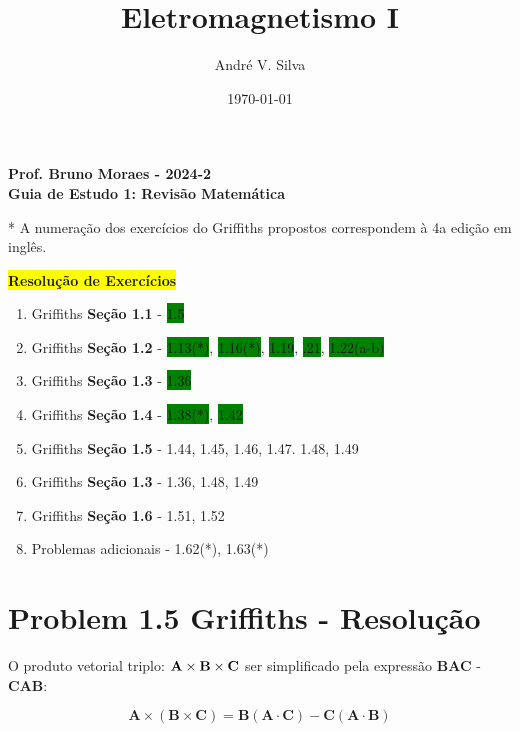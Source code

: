 \documentclass[a4paper,12pt]{article}
\title{ \textbf{\large Eletromagnetismo I }}
\author{Andr\'e V. Silva}
\date{\today}
\begin{document}
\maketitle

\begin{center}
    \textbf{Prof. Bruno Moraes - 2024-2}\\
    \textbf{Guia de Estudo 1: Revisão Matemática}
    \end{center}
    
    * A numeração dos exercícios do Griffiths propostos correspondem à 4a edição em inglês.\\
    
    \begin{center}
    \colorbox{yellow}{\textbf{Resolu\c{c}\~ao de Exerc\'icios}}
    \end{center}
    
    \begin{enumerate}
    \item Griffiths \textbf{Seção 1.1} - \colorbox{green}{1.5} 
    \item Griffiths \textbf{Seção 1.2} - \colorbox{green}{1.13(*)}, \colorbox{green}{1.16(*)}, \colorbox{green}{1.19}, \colorbox{green}{.21}, \colorbox{green}{1.22(a-b)}
    \item Griffiths \textbf{Seção 1.3} - \colorbox{green}{1.36}
    \item Griffiths \textbf{Seção 1.4} - \colorbox{green}{1.38(*)}, \colorbox{green}{1.42}
    \item Griffiths \textbf{Seção 1.5} - 1.44, 1.45, 1.46, 1.47. 1.48, 1.49
    \item Griffiths \textbf{Seção 1.3} - 1.36, 1.48, 1.49
    \item Griffiths \textbf{Seção 1.6} - 1.51, 1.52
    \item Problemas adicionais - 1.62(*), 1.63(*)
    \end{enumerate}

\section*{Problem 1.5 Griffiths - Resolu\c{c}\~ao}

O produto vetorial triplo: $\textrm{\textbf{A}}\times\textrm{\textbf{B}}\times\textrm{\textbf{C}}$
ser simplificado pela express\~ao \textbf{BAC} - \textbf{CAB}:

\begin{equation}
    \textbf{A}\times(\textbf{B}\times\textbf{C}) =  \textbf{B}(\textbf{A}\cdot\textbf{C}) - \textbf{C}(\textbf{A}\cdot\textbf{B})
\end{equation}
\end{document}
